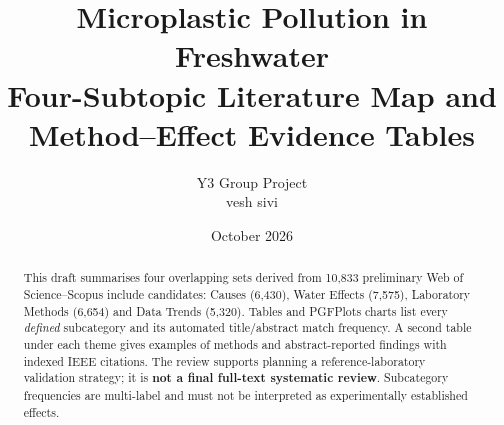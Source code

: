 \documentclass[10pt,a4paper]{article}
\title{Microplastic Pollution in Freshwater\\\large Four-Subtopic Literature Map and Method--Effect Evidence Tables}
\author{Y3 Group Project\\vesh sivi}
\date{October 2026}
\begin{document}
\maketitle
\begin{abstract}
This draft summarises four overlapping sets derived from 10,833 preliminary Web of Science--Scopus include candidates: Causes (6,430), Water Effects (7,575), Laboratory Methods (6,654) and Data Trends (5,320). Tables and PGFPlots charts list every \emph{defined} subcategory and its automated title/abstract match frequency. A second table under each theme gives examples of methods and abstract-reported findings with indexed IEEE citations. The review supports planning a reference-laboratory validation strategy; it is \textbf{not a final full-text systematic review}. Subcategory frequencies are multi-label and must not be interpreted as experimentally established effects.
\end{abstract}
\end{document}
